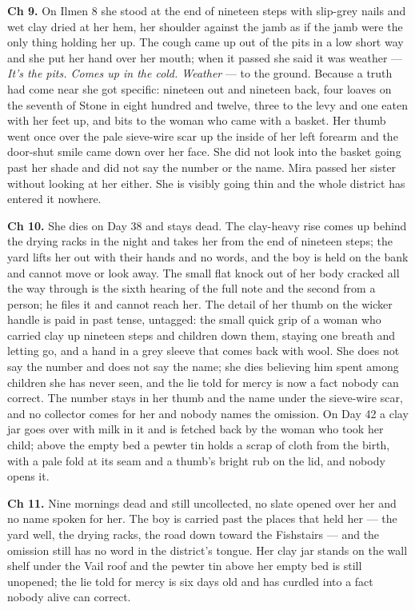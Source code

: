 \documentclass{design/chronicle}
\begin{document}
{\textbf{Ch 9.} On Ilmen 8 she stood at the end of nineteen steps with slip-grey nails and wet clay dried at her hem, her shoulder against the jamb as if the jamb were the only thing holding her up. The cough came up out of the pits in a low short way and she put her hand over her mouth; when it passed she said it was weather --- \emph{It’s the pits. Comes up in the cold. Weather} --- to the ground. Because a truth had come near she got specific: nineteen out and nineteen back, four loaves on the seventh of Stone in eight hundred and twelve, three to the levy and one eaten with her feet up, and bits to the woman who came with a basket. Her thumb went once over the pale sieve-wire scar up the inside of her left forearm and the door-shut smile came down over her face. She did not look into the basket going past her shade and did not say the number or the name. Mira passed her sister without looking at her either. She is visibly going thin and the whole district has entered it nowhere.

\textbf{Ch 10.} She dies on Day 38 and stays dead. The clay-heavy rise comes up behind the drying racks in the night and takes her from the end of nineteen steps; the yard lifts her out with their hands and no words, and the boy is held on the bank and cannot move or look away. The small flat knock out of her body cracked all the way through is the sixth hearing of the full note and the second from a person; he files it and cannot reach her. The detail of her thumb on the wicker handle is paid in past tense, untagged: the small quick grip of a woman who carried clay up nineteen steps and children down them, staying one breath and letting go, and a hand in a grey sleeve that comes back with wool. She does not say the number and does not say the name; she dies believing him spent among children she has never seen, and the lie told for mercy is now a fact nobody can correct. The number stays in her thumb and the name under the sieve-wire scar, and no collector comes for her and nobody names the omission. On Day 42 a clay jar goes over with milk in it and is fetched back by the woman who took her child; above the empty bed a pewter tin holds a scrap of cloth from the birth, with a pale fold at its seam and a thumb’s bright rub on the lid, and nobody opens it.

\textbf{Ch 11.} Nine mornings dead and still uncollected, no slate opened over her and no name spoken for her. The boy is carried past the places that held her --- the yard well, the drying racks, the road down toward the Fishstairs --- and the omission still has no word in the district’s tongue. Her clay jar stands on the wall shelf under the Vail roof and the pewter tin above her empty bed is still unopened; the lie told for mercy is six days old and has curdled into a fact nobody alive can correct.

}
\end{document}
